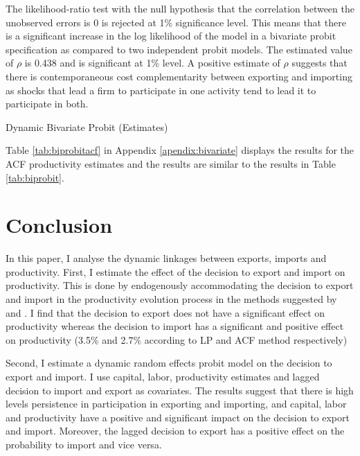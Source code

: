 \documentclass[12pt]{article}
\begin{document}
 The likelihood-ratio test with the null hypothesis that
  the correlation between the unobserved errors is 0 is rejected at
  1\% significance level. This means that there is a significant
  increase in the log likelihood of the model in a bivariate probit
  specification as compared to two independent probit models.
The estimated value of $\rho$ is 0.438 and
  is significant at 1\% level. A positive estimate of $\rho$ suggests that there is
  contemporaneous cost complementarity between exporting and importing 
as shocks that lead a firm to participate in one activity tend
to lead it to participate in both.


\begin{center}
\begin{table}[H]
\caption{Dynamic Bivariate Probit (Estimates)}
\label{tab:biprobit}

\end{table}
\end{center} 

Table \ref{tab:biprobitacf} in Appendix \ref{apendix:bivariate} displays the results for the ACF
productivity estimates and the results are similar to the results in Table \ref{tab:biprobit}. 
 
\section{Conclusion}\label{sec:conclusion}

In this paper, I analyse the dynamic linkages between exports, imports
and productivity. First, I estimate the effect of the decision to export and import
on productivity. This is done by endogenously accommodating the
decision to export and import in the productivity evolution process in
the methods suggested by \textcite{levinsohn2003estimating} and
\textcite{ackerberg2006structural}. I find that the decision to export
does not have a significant effect on productivity whereas the
decision to import has a significant and positive effect  on
productivity (3.5\% and 2.7\% according to LP and ACF method respectively) 

Second, I estimate a dynamic random effects probit model on the
decision to export and import. I use  capital, labor,  productivity
estimates and lagged decision to import and
export as covariates. The results suggest that there is high levels persistence in participation in exporting and importing,
and capital, labor and  productivity have a positive and significant
impact on the decision to export and import. Moreover, the lagged
decision to export has a positive effect on the probability to import
and vice versa. 
\end{document}
